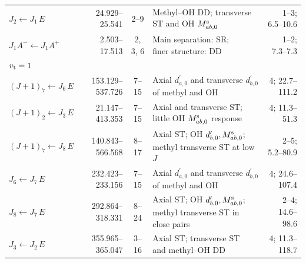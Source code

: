 \begin{table}[!tp]
\begin{ruledtabular}
\begin{tabular}{lrc lr}
$J_2\leftarrow J_1\,E$\hspace{0.6em} & 24.929--25.541 & 2--9 & \shortstack[l]{Methyl--OH DD; transverse\\ST and OH $M^{\rm s}_{ab,0}$} & 1--3; 6.5--10.6 \\[3pt]
$J_1A^-\leftarrow J_1A^+$\hspace{0.6em} & 2.503--17.513 & 2, 3, 6 & \shortstack[l]{Main separation: SR;\\finer structure: DD} & 1--2; 7.3--7.3 \\[3pt]
\hline
\multicolumn{5}{l}{$v_{\rm t}=1$}\\
$(J+1)_7\leftarrow J_6\,E$\hspace{0.6em} & 153.129--537.726 & 7--15 & \shortstack[l]{Axial $d^{\prime}_{a,0}$ and transverse\\$d^{\prime}_{b,0}$ of methyl and OH} & 4; 22.7--111.2 \\[3pt]
$(J+1)_2\leftarrow J_3\,E$\hspace{0.6em} & 21.147--413.353 & 7--15 & \shortstack[l]{Axial and transverse ST;\\little OH $M^{\rm s}_{ab,0}$ response} & 4; 11.3--51.3 \\[3pt]
$(J+1)_7\leftarrow J_8\,E$\hspace{0.6em} & 140.843--566.568 & 8--17 & \shortstack[l]{Axial ST; OH $d^{\prime}_{b,0},M^{\rm s}_{ab,0}$;\\methyl transverse ST at low $J$} & 2--5; 5.2--80.9 \\[3pt]
$J_6\leftarrow J_7\,E$\hspace{0.6em} & 232.423--233.156 & 7--15 & \shortstack[l]{Axial $d^{\prime}_{a,0}$ and transverse\\$d^{\prime}_{b,0}$ of methyl and OH} & 4; 24.6--107.4 \\[3pt]
$J_8\leftarrow J_7\,E$\hspace{0.6em} & 292.864--318.331 & 8--24 & \shortstack[l]{Axial ST; OH $d^{\prime}_{b,0},M^{\rm s}_{ab,0}$;\\methyl transverse ST in close pairs} & 2--4; 14.6--98.6 \\[3pt]
$J_3\leftarrow J_2\,E$\hspace{0.6em} & 355.965--365.047 & 3--16 & \shortstack[l]{Axial ST; transverse ST\\and methyl--OH DD} & 4; 11.3--118.7 \\[3pt]
\end{tabular}
\end{ruledtabular}
\endgroup
\par\vspace{3pt}

\end{table}
